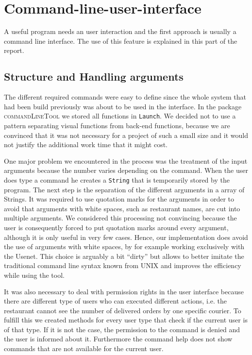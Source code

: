 \section{Command-line-user-interface}
\label{sec:command_line_user_interface}

A useful program needs an user interaction and the first approach is usually a command line 
interface. The use of this feature is explained in this part of the report.

\subsection{Structure and Handling arguments}
\label{sub:structure_and_handling_arguments}

The different required commands were easy to define since the whole system that had been build 
previously was about to be used in the interface. In the package \textsc{commandLineTool} we 
stored all functions in \lstinline|Launch|. We decided not to use a pattern separating
visual functions from back-end functions, because we are convinced that it was not necessary for a
project of such a small size and it would not justify the additional work time that it might 
cost.

One major problem we encountered in the process was the treatment of the input arguments because 
the number varies depending on the command. When the user does type a command he creates a 
\lstinline|String| that is temporarily stored by the program. The next step is the separation of 
the different arguments in a array of Strings. It was required to use quotation marks for the 
arguments in order to avoid that arguments with white spaces, such as restaurant names,  are cut
into multiple arguments.
We considered this processing not convincing because the user is consequently forced to put 
quotation marks around every argument, although it is only useful in very few cases. Hence, 
our implementation does avoid the use of arguments with white spaces, by for example working 
exclusively with the Usenet. This choice is arguably a bit ``dirty'' but allows to better 
imitate the traditional command line syntax known from \textsc{UNIX} and improves the efficiency 
while using the tool.

It was also necessary to deal with permission rights in the user interface because there are 
different type of users who can executed different actions, i.e. the restaurant cannot see
the number of delivered orders by one specific courier. To fulfill this we created methods for
every user type that check if the current user is of that type. If it is not the case, the 
permission to the command is denied and the user is informed about it. Furthermore the 
command help does not show commands that are not available for the current user.

